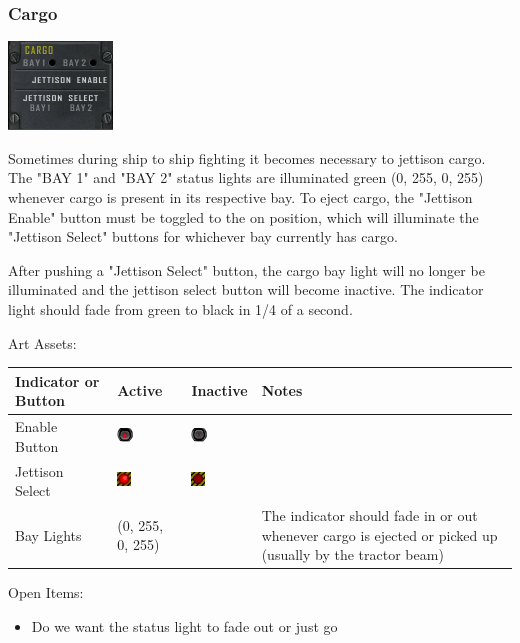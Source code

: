 \subsubsection{Cargo}

\includegraphics[scale=0.7]{images/cargo.png}

Sometimes during ship to ship fighting it becomes necessary to jettison cargo.
The "BAY 1" and "BAY 2" status lights are illuminated green (0, 255, 0, 255)
whenever cargo is present in its respective bay.  To eject cargo, the
"Jettison Enable" button must be toggled to the on position, which will
illuminate the "Jettison Select" buttons for whichever bay currently
has cargo.

After pushing a "Jettison Select" button, the cargo bay light will no longer
be illuminated and the jettison select button will become inactive.  The
indicator light should fade from green to black in 1\slash 4 of a second.

Art Assets:

\begin{tabular}{ | l | l | l | p{3.5cm} | }
\hline
Indicator or Button & Active & Inactive & Notes \\
\hline
Enable Button & \includegraphics{images/button_red_on.png} & \includegraphics{images/button_red_off.png} & \\
Jettison Select & \includegraphics{images/button_danger_on.png} & \includegraphics{images/button_danger_off.png} & \\
Bay Lights & (0, 255, 0, 255) & & The indicator should fade in or out whenever
cargo is ejected or picked up (usually by the tractor beam) \\ 
\hline
\end{tabular}

Open Items:
\begin{itemize}
\item Do we want the status light to fade out or just go 
\end{itemize}

